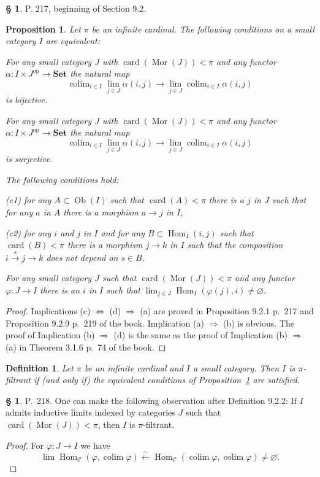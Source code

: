 \documentclass[12pt]{article}%
\newtheorem{prop}[thm]{Proposition}
\newtheorem{df}[thm]{Definition}%
\theoremstyle{remark}
\theoremstyle{definition}
\newtheorem{s}[thm]{\S}%
\newcommand{\nn}{\noindent}
\newcommand{\C}{\mathcal C}
\newcommand{\Set}{\mathbf{Set}}
\newcommand{\pp}{\varphi}
\newcommand{\ssi}{\Leftrightarrow}%
\newcommand{\then}{\Rightarrow}
\newcommand{\xr}{\xrightarrow}
\DeclareMathOperator*{\colim}{colim}
\DeclareMathOperator{\card}{card}%
\DeclareMathOperator{\Hom}{Hom}%
\DeclareMathOperator{\Mor}{Mor}
\DeclareMathOperator{\Ob}{Ob}
\DeclareMathOperator{\op}{op}
\begin{document}
\begin{s}
P. 217, beginning of Section 9.2. 

\begin{prop}\label{ppifil}
Let $\pi$ be an infinite cardinal. The following conditions on a small category $I$ are equivalent:

\nn{\em(a)} For any small category $J$ with $\card(\Mor(J))<\pi$ and any functor $\alpha:I\times J^{\op}\to\Set$ the natural map 
$$
\colim_{i\in I}\lim_{j\in J}\alpha(i,j)\to\lim_{j\in J}\colim_{i\in I}\alpha(i,j)
$$ 
is bijective.

\nn{\em(b)} For any small category $J$ with $\card(\Mor(J))<\pi$ and any functor $\alpha:I\times J^{\op}\to\Set$ the natural map 
$$
\colim_{i\in I}\lim_{j\in J}\alpha(i,j)\to\lim_{j\in J}\colim_{i\in I}\alpha(i,j)
$$ 
is surjective.

\nn{\em(c)} The following conditions hold:

{\em(c1)} for any $A\subset\Ob(I)$ such that $\card(A)<\pi$ there is a $j$ in $J$ such that for any $a$ in $A$ there is a morphism $a\to j$ in $I$,

{\em(c2)} for any $i$ and $j$ in $I$ and for any $B\subset\Hom_I(i,j)$ such that $\card(B)<\pi$ there is a morphism $j\to k$ in $I$ such that the composition $i\xr sj\to k$ does not depend on $s\in B$.

\nn{\em(d)} For any small category $J$ such that $\card(\Mor(J))<\pi$ and any functor $\pp:J\to I$ there is an $i$ in $I$ such that $\lim_{j\in J}\Hom_I(\pp(j),i)\neq\varnothing$. 
\end{prop}

\begin{proof}
Implications (c) $\ssi$ (d) $\then$ (a) are proved in Proposition 9.2.1 p.~217 and Proposition 9.2.9 p.~219 of the book. Implication (a) $\then$ (b) is obvious. The proof of Implication (b) $\then$ (d) is the same as the proof of Implication (b) $\then$ (a) in Theorem 3.1.6 p.~74 of the book.
\end{proof}

\begin{df}%
Let $\pi$ be an infinite cardinal and $I$ a small category. Then $I$ is $\pi$-{\em filtrant} if (and only if) the equivalent conditions of Proposition~\ref{ppifil} are satisfied.
\end{df}
\end{s}

%

\begin{s}\label{922}
P.~218. One can make the following observation after Definition 9.2.2: If $I$ admits inductive limits indexed by categories $J$ such that $\card(\Mor(J))<\pi$, then $I$ is $\pi$-filtrant.

\begin{proof}
For $\varphi:J\to I$ we have
$$
\lim\Hom_\C(\varphi,\colim\varphi)\xleftarrow\sim\Hom_\C(\colim\varphi,\colim\varphi)\neq\varnothing.
$$
\end{proof}
\end{s}
\end{document}
